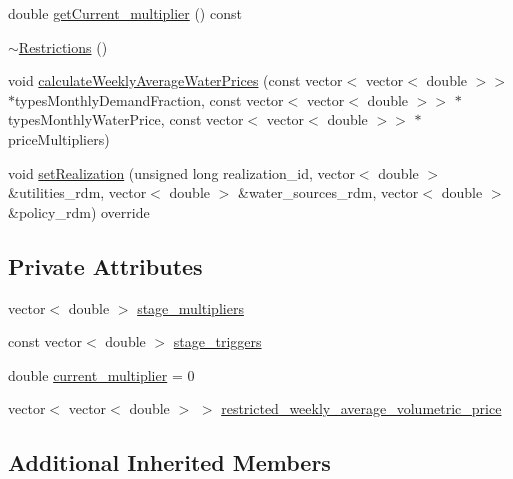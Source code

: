 \begin{DoxyCompactItemize}
\item 
double \mbox{\hyperlink{classRestrictions_a4282debfe00607f87f59a08ec1844d40_a4282debfe00607f87f59a08ec1844d40}{get\+Current\+\_\+multiplier}} () const
\item 
\mbox{\hyperlink{classRestrictions_a54c8a857a2beed78d34a46c36951b004_a54c8a857a2beed78d34a46c36951b004}{$\sim$\+Restrictions}} ()
\item 
void \mbox{\hyperlink{classRestrictions_a5155dcecc8b995c1793fa400f1533959_a5155dcecc8b995c1793fa400f1533959}{calculate\+Weekly\+Average\+Water\+Prices}} (const vector$<$ vector$<$ double $>$$>$ $\ast$types\+Monthly\+Demand\+Fraction, const vector$<$ vector$<$ double $>$$>$ $\ast$types\+Monthly\+Water\+Price, const vector$<$ vector$<$ double $>$$>$ $\ast$price\+Multipliers)
\item 
void \mbox{\hyperlink{classRestrictions_abc17a8a403311933a3bb58fbecd5f5fd_abc17a8a403311933a3bb58fbecd5f5fd}{set\+Realization}} (unsigned long realization\+\_\+id, vector$<$ double $>$ \&utilities\+\_\+rdm, vector$<$ double $>$ \&water\+\_\+sources\+\_\+rdm, vector$<$ double $>$ \&policy\+\_\+rdm) override
\end{DoxyCompactItemize}
\subsection*{Private Attributes}
\begin{DoxyCompactItemize}
\item 
vector$<$ double $>$ \mbox{\hyperlink{classRestrictions_ae05c6899c05a7ffe39c4ceb7cdcd3daf_ae05c6899c05a7ffe39c4ceb7cdcd3daf}{stage\+\_\+multipliers}}
\item 
const vector$<$ double $>$ \mbox{\hyperlink{classRestrictions_a1c519068b4ab14737f726817f1edf9d0_a1c519068b4ab14737f726817f1edf9d0}{stage\+\_\+triggers}}
\item 
double \mbox{\hyperlink{classRestrictions_aa640571d6082e54187bc1472c6114f69_aa640571d6082e54187bc1472c6114f69}{current\+\_\+multiplier}} = 0
\item 
vector$<$ vector$<$ double $>$ $>$ \mbox{\hyperlink{classRestrictions_a987355e7c1e8e614faccb8aa06523563_a987355e7c1e8e614faccb8aa06523563}{restricted\+\_\+weekly\+\_\+average\+\_\+volumetric\+\_\+price}}
\end{DoxyCompactItemize}
\subsection*{Additional Inherited Members}


